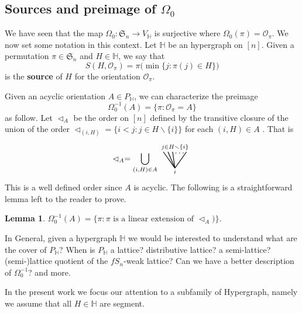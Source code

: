 \documentclass[reqno]{amsart}
\newtheorem{lemma}[theorem]{Lemma}
\theoremstyle{definition}
\newcommand{\ssm}{\smallsetminus} %
\newcommand{\defn}[1]{\textbf{\textsf{\color{PineGreen} #1}}} %
\newcommand{\fS}{\mathfrak{S}} %
\newcommand{\less}{\vartriangleleft} %
\newcommand{\Or}{\mathcal O}  %
\newcommand{\HH}{\mathbb H}  %
\begin{document}
\subsection{Sources and preimage of $\Omega_0$} 
\label{subsec:notation}

We have seen that the map $\Omega_0 \colon \fS_n \to V_{\HH}$ is surjective where $\Omega_0(\pi)=\Or_\pi$.
We now set some notation in this context. Let $\HH$ be  an hypergraph on $[n]$. Given a permutation $\pi\in\fS_n$ and $H\in \HH$,
we say that 
\begin{equation}\label{eq:source}
	S(H,\Or_\pi)=\pi\big( \min\{j:\pi(j)\in H\}\big)
\end{equation}
is the \defn{source} of $H$ for the orientation $\Or_\pi$. 

Given an acyclic orientation $A\in P_\HH$,  we can characterize the preimage 
	$$ \Omega_0^{-1}(A)=\{ \pi : \Or_\pi=A\}$$
as follow. Let $\less_A$ be the order on $[n]$ defined by the transitive closure of the union of 
the order $\less_{(i,H)}=\big\{ i< j : j\in H\ssm\{i\}\big\}$ for each $(i,H)\in A$ . That is
 	$$\less_A =  \bigcup_{(i,H)\in A} 
	\begin{tikzpicture}[scale=1,baseline=.0cm]
	\node at (0,-.45) {$\scriptstyle i$};
	\node at (0,.6) {$\scriptstyle j\in H\ssm \{i\}$};
	\node at (.2,.35) {$\ldots$};
	\draw [thick] (0,-.3)--(-.5,.4); 
	\draw [thick] (0,-.3)--(-.3,.4); 
	\draw [thick] (0,-.3)--(-.1,.4); 
	\draw [thick] (0,-.3)--(.5,.4); 
	\end{tikzpicture}
	$$
This is a well defined order since $A$ is acyclic. The following is a straightforward lemma left to the reader to prove.
\begin{lemma}\label{lem:prepi}   $ \Omega_0^{-1}(A) =\big\{ \pi : \pi \text{ is a linear extension of }  \less_A)\big\}$.
\end{lemma}


In General, given a hypergraph $\HH$ we would be interested to understand what are the cover of $P_{\HH}$? 
When is $P_{\HH}$ a lattice? distributive lattice? a semi-lattice? (semi-)lattice quotient of the $fS_n$-weak lattice?
Can we have a better description of $\Omega_0^{-1}$? and more.

In the present work we focus our attention to a subfamily of Hypergraph, namely we assume that all $H\in \HH$ are segment.

\end{document}
